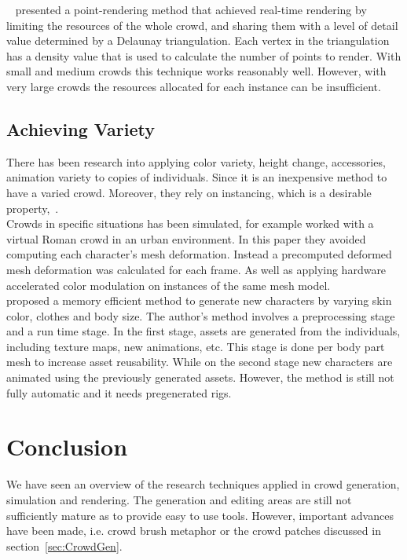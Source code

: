 \documentclass[6pt]{article} %
\begin{document}
\begin{multicols}{2}
~\cite{Larkin2010} presented a point-rendering method that achieved real-time rendering by limiting the resources of the whole crowd, and sharing them with a level of detail value determined by a Delaunay triangulation. 
Each vertex in the triangulation has a density value that is used to calculate the number of points to render.
With small and medium crowds this technique works reasonably well.
However, with very large crowds the resources allocated for each instance can be insufficient.

\subsection{Achieving Variety}

There has been research into applying color variety, height change, accessories, animation variety to copies of individuals.
Since it is an inexpensive method to have a varied crowd.
Moreover, they rely on instancing, which is a desirable property,~\cite{zelsnack2004glsl}.\\

Crowds in specific situations has been simulated, for example \cite{deHeras2005} worked with a virtual Roman crowd in an urban environment.
In this paper they avoided computing each character’s mesh deformation.
Instead a precomputed deformed mesh deformation was calculated for each frame. 
As well as applying hardware accelerated color modulation on instances of the same mesh model.\\

\cite{ruiz2013} proposed a memory efficient method to generate new characters by varying skin color, clothes and body size.
The author's method involves a preprocessing stage and a run time stage.
In the first stage, assets are generated from the individuals, including texture maps, new animations, etc.
This stage is done per body part mesh to increase asset reusability.
While on the second stage new characters are animated using the previously generated assets.
However, the method is still not fully automatic and it needs pregenerated rigs.

\section{Conclusion}
We have seen an overview of the research techniques applied in crowd generation, simulation and rendering.
The generation and editing areas are still not sufficiently mature as to provide easy to use tools.
However, important advances have been made, i.e. crowd brush metaphor or the crowd patches discussed in section~\ref{sec:CrowdGen}.\\


\end{multicols}
\end{document}
